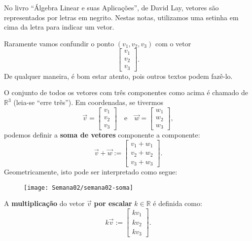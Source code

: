 No livro ``Álgebra Linear e suas Aplicações'', de David Lay, vetores são representados por letras em negrito. Nestas notas, utilizamos uma setinha em cima da letra para indicar um vetor.

Raramente vamos confundir o ponto $(v_1, v_2, v_3)$ com o vetor
\begin{equation}
\left[
\begin{array}{c}
v_1 \\
v_2 \\
v_3
\end{array}
\right].
\end{equation} De qualquer maneira, é bom estar atento, pois outros textos podem fazê-lo.

O conjunto de todos os vetores com três componentes como acima é chamado de $\mathbb{R}^3$ (leia-se ``erre três''). Em coordenadas, se tivermos
\begin{equation}
\vec{v} =
\left[
  \begin{array}{c}
    v_1 \\
    v_2 \\
    v_3
  \end{array}
\right]  \quad  \text{e} \quad
\vec{w} =
\left[
  \begin{array}{c}
    w_1 \\
    w_2 \\
    w_3
  \end{array}
\right],
\end{equation} podemos definir a \textbf{soma de vetores} componente a componente:
\begin{equation}
\vec{v} + \vec{w} :=
\left[
  \begin{array}{c}
    v_1 + w_1 \\
    v_2 + w_2 \\
    v_3 + w_3
  \end{array}
\right].
\end{equation} Geometricamente, isto pode ser interpretado como segue:
\begin{figure}[h!]
\begin{center}
\texttt{[image: Semana02/semana02-soma]}
\end{center}
\end{figure}

A \textbf{multiplicação} do vetor $\vec{v}$ \textbf{por escalar} $k \in \mathbb{R}$ é definida como:
\begin{equation}
k \vec{v} :=
\left[
  \begin{array}{c}
    k v_1 \\
    k v_2 \\
    k v_3
  \end{array}
\right].
\end{equation}


